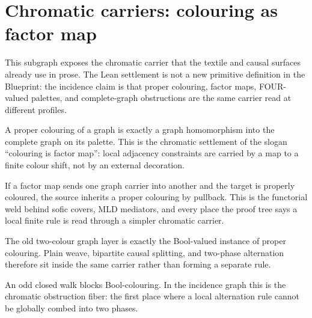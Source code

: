 \section{Chromatic carriers: colouring as factor map}

This subgraph exposes the chromatic carrier that the textile and causal
surfaces already use in prose.  The Lean settlement is not a new primitive
definition in the Blueprint: the incidence claim is that proper colouring,
factor maps, FOUR-valued palettes, and complete-graph obstructions are the
same carrier read at different profiles.

\begin{proposition}\label{thm:proper-colouring-factor-map}\leanok{}
A proper colouring of a graph is exactly a graph homomorphism into the complete
graph on its palette.  This is the chromatic settlement of the slogan
``colouring is factor map'': local adjacency constraints are carried by a map
to a finite colour shift, not by an external decoration.
\end{proposition}

\begin{theorem}\label{thm:colourings-pull-back}\leanok{}
If a factor map sends one graph carrier into another and the target is properly
coloured, the source inherits a proper colouring by pullback.  This is the
functorial weld behind sofic covers, MLD mediators, and every place the proof
tree says a local finite rule is read through a simpler chromatic carrier.
\end{theorem}

\begin{proposition}\label{thm:bool-colouring-bipartite}\leanok{}
The old two-colour graph layer is exactly the Bool-valued instance of proper
colouring.  Plain weave, bipartite causal splitting, and two-phase alternation
therefore sit inside the same carrier rather than forming a separate rule.
\end{proposition}

\begin{theorem}\label{thm:odd-cycle-obstructs-two-colouring}\leanok{}
An odd closed walk blocks Bool-colouring.  In the incidence graph this is the
chromatic obstruction fiber: the first place where a local alternation rule
cannot be globally combed into two phases.
\end{theorem}

